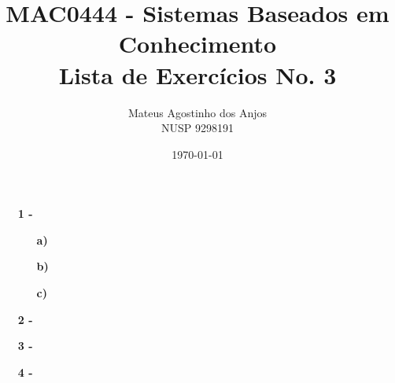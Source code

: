 \documentclass[12pt]{article}
\title{MAC0444 - Sistemas Baseados em Conhecimento \\
Lista de Exercícios No. 3
}
\author{Mateus Agostinho dos Anjos\\NUSP 9298191}
\date{\today}
\begin{document}
	\maketitle
	\begin{itemize}
		\item[\textbf{1 -}]
			\hfill\newline
			\begin{itemize}
				\item[\textbf{a) }]
				\item[\textbf{b) }]
				\item[\textbf{c) }]
			\end{itemize}
		\item[\textbf{2 -}]
		\item[\textbf{3 -}]
		\item[\textbf{4 -}]
	\end{itemize}
\end{document}
